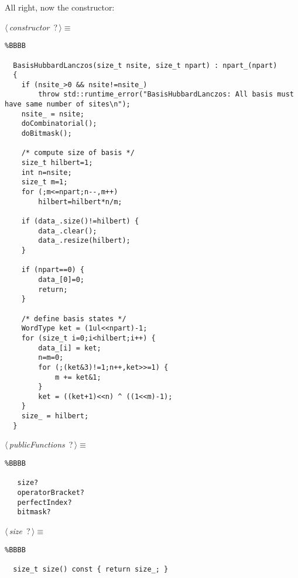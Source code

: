 \documentclass{report}
\begin{document}
All right, now the constructor:
\begin{flushleft} \small
\begin{minipage}{\linewidth}\label{scrap6}\raggedright\small
{} $\langle\,${\it constructor}\nobreak\ {\footnotesize {?}}$\,\rangle\equiv$
\begin{lstlisting}%BBBB
    
  BasisHubbardLanczos(size_t nsite, size_t npart) : npart_(npart)  
  {  
  	if (nsite_>0 && nsite!=nsite_)  
  		throw std::runtime_error("BasisHubbardLanczos: All basis must have same number of sites\n");  
  	nsite_ = nsite;  
  	doCombinatorial();  
  	doBitmask();  
    
  	/* compute size of basis */  
  	size_t hilbert=1;  
  	int n=nsite;  
  	size_t m=1;  
  	for (;m<=npart;n--,m++)  
  		hilbert=hilbert*n/m;  
    
  	if (data_.size()!=hilbert) {  
  		data_.clear();  
  		data_.resize(hilbert);  
  	}  
    
  	if (npart==0) {  
  		data_[0]=0;  
  		return;  
  	}  
  	  
  	/* define basis states */  
  	WordType ket = (1ul<<npart)-1;  
  	for (size_t i=0;i<hilbert;i++) {  
  		data_[i] = ket;  
  		n=m=0;  
  		for (;(ket&3)!=1;n++,ket>>=1) {  
  			m += ket&1;  
  		}  
  		ket = ((ket+1)<<n) ^ ((1<<m)-1);  
  	}  
  	size_ = hilbert;  
  }  \end{lstlisting}
\end{minipage}\vspace{4ex}
\end{flushleft}
\begin{flushleft} \small
\begin{minipage}{\linewidth}\label{scrap7}\raggedright\small
{} $\langle\,${\it publicFunctions}\nobreak\ {\footnotesize {?}}$\,\rangle\equiv$
\begin{lstlisting}%BBBB
    
   size?  
   operatorBracket?  
   perfectIndex?  
   bitmask?  
   \end{lstlisting}
\end{minipage}\vspace{4ex}
\end{flushleft}
\begin{flushleft} \small
\begin{minipage}{\linewidth}\label{scrap8}\raggedright\small
{} $\langle\,${\it size}\nobreak\ {\footnotesize {?}}$\,\rangle\equiv$
\begin{lstlisting}%BBBB
    
  size_t size() const { return size_; }  \end{lstlisting}
\end{minipage}\vspace{4ex}
\end{flushleft}
\end{document}
